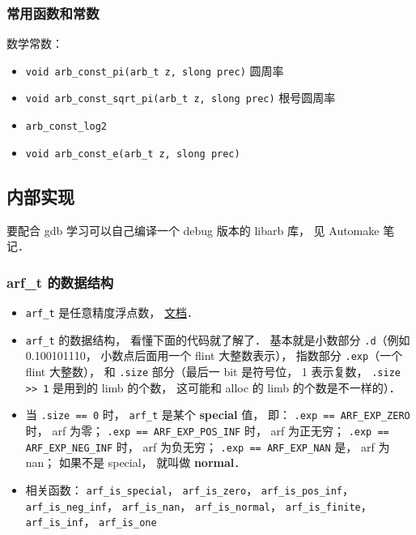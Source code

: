 \subsubsection{常用函数和常数}
数学常数：
\begin{itemize}
\item \verb|void arb_const_pi(arb_t z, slong prec)| 圆周率
\item \verb|void arb_const_sqrt_pi(arb_t z, slong prec)| 根号圆周率
\item \verb|arb_const_log2|
\item \verb|void arb_const_e(arb_t z, slong prec)|
\end{itemize}


\subsection{内部实现}
要配合 gdb 学习可以自己编译一个 debug 版本的 libarb 库， 见 Automake 笔记．

\subsubsection{arf\_t 的数据结构}
\begin{itemize}
\item \verb|arf_t| 是任意精度浮点数， \href{https://arblib.org/arf.html}{文档}．
\item \verb|arf_t| 的数据结构， 看懂下面的代码就了解了． 基本就是小数部分 \verb|.d|（例如 0.100101110， 小数点后面用一个 flint 大整数表示）， 指数部分 \verb|.exp|（一个 flint 大整数）， 和 \verb|.size| 部分（最后一 bit 是符号位， 1 表示复数， \verb|.size >> 1| 是用到的 limb 的个数， 这可能和 alloc 的 limb 的个数是不一样的）．
\item 当 \verb|.size == 0| 时， \verb|arf_t| 是某个 \textbf{special} 值， 即： \verb|.exp == ARF_EXP_ZERO| 时， arf 为零； \verb|.exp == ARF_EXP_POS_INF| 时， arf 为正无穷； \verb|.exp == ARF_EXP_NEG_INF| 时， arf 为负无穷； \verb|.exp == ARF_EXP_NAN| 是， arf 为 nan； 如果不是 special， 就叫做 \textbf{normal}．
\item 相关函数： \verb|arf_is_special|， \verb|arf_is_zero|， \verb|arf_is_pos_inf|， \verb|arf_is_neg_inf|， \verb|arf_is_nan|， \verb|arf_is_normal|， \verb|arf_is_finite|， \verb|arf_is_inf|， \verb|arf_is_one|
\end{itemize}

